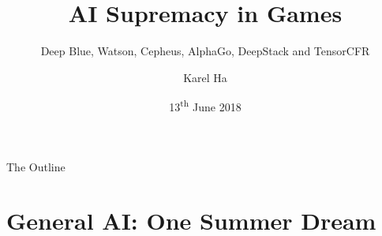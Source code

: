\documentclass{beamer}
\title{\Huge AI Supremacy in Games}
\subtitle{\small Deep Blue, Watson, Cepheus, AlphaGo, DeepStack and TensorCFR}
\date{13\textsuperscript{th} June 2018}
\author{Karel Ha}
\institute{Artificial Intelligence Center\\
  Czech Technical University in Prague}
\begin{document}
  {
    \maketitle
  }

  \begin{frame}{The Outline}
    \tableofcontents
  \end{frame}


  \section{General AI: One Summer Dream}

\end{document}
